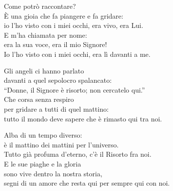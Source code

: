

\spazio

\strofa Come potrò raccontare?\\
È una gioia che fa piangere e fa gridare:\\
io l'ho visto con i miei occhi, era vivo, era Lui.\\
E m'ha chiamata per nome:\\
era la sua voce, era il mio Signore!\\
Io l'ho visto con i miei occhi, era lì davanti a me.

\spazio


\spazio

\strofa Gli angeli ci hanno parlato\\
davanti a quel sepolocro spalancato:\\
``Donne, il Signore è risorto; non cercatelo qui.''\\
Che corsa senza respiro\\
per gridare a tutti di quel mattino:\\
tutto il mondo deve sapere che è rimasto qui tra noi.

\spazio


\spazio

\strofa Alba di un tempo diverso:\\
è il mattino dei mattini per l'universo.\\
Tutto già profuma d'eterno, c'è il Risorto fra noi.\\
E le sue piaghe e la gloria\\
sono vive dentro la nostra storia,\\
segni di un amore che resta qui per sempre qui con noi.

\spazio

